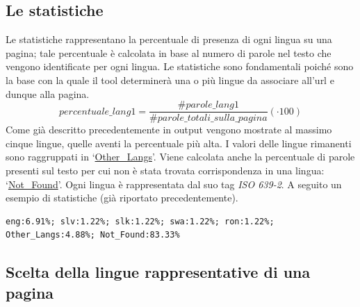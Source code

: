 \documentclass{article}
\newcommand{\isoTwo}{\textit{ISO 639-2}}
\newcommand{\mintedstyle}[1]{\url{#1}}
\begin{document}
\subsection{Le statistiche}
Le statistiche rappresentano la percentuale di presenza di ogni lingua su una pagina; tale percentuale è calcolata in base al numero di parole nel testo che vengono identificate per ogni lingua. Le statistiche sono fondamentali poiché sono la base con la quale il tool determinerà una o più lingue da associare all'url e dunque alla pagina. 
\begin{equation*}
     percentuale\_lang1 = \frac{\#parole\_lang1}{\#parole\_totali\_sulla\_pagina} (\cdot 100)
\end{equation*}
Come già descritto precedentemente in output vengono mostrate al massimo cinque lingue, quelle aventi la percentuale più alta. I valori delle lingue rimanenti sono raggruppati in `\mintedstyle{Other\_Langs}'. Viene calcolata anche la percentuale di parole presenti sul testo per cui non è stata trovata corrispondenza in una lingua: `\mintedstyle{Not\_Found}'. Ogni lingua è rappresentata dal suo tag \isoTwo{}. A seguito un esempio di statistiche (già riportato precedentemente).
\begin{verbatim}
eng:6.91%; slv:1.22%; slk:1.22%; swa:1.22%; ron:1.22%;
Other_Langs:4.88%; Not_Found:83.33%
\end{verbatim}

\subsection{Scelta della lingue rappresentative di una pagina}
\end{document}
